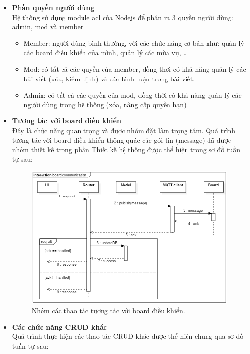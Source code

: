 \documentclass[a4paper,12pt,oneside]{article}
\begin{document}
\begin{itemize}
	\item \textbf{Phần quyền người dùng}\\
	Hệ thống sử dụng module acl của Nodejs để phân ra 3 quyền người dùng: admin, mod và member
	
	\begin{itemize}
		\item Member: người dùng bình thường, với các chức năng cơ bản như: quản lý các board điều khiển của mình, quản lý các mùa vụ, …
		\item Mod: có tất cả các quyền của member, đồng thời có khả năng quản lý các bài viết (xóa, kiểm định) và các bình luận trong bài viết.
		\item Admin: có tất cả các quyền của mod, đồng thời có khả năng quản lý các người dùng trong hệ thống (xóa, nâng cấp quyền hạn).
	\end{itemize}
	
	\item \textbf{Tương tác với board điều khiển}\\
	Đây là chức năng quan trọng và được nhóm đặt làm trọng tâm. Quá trình tương tác với board điều khiển thông quác các gói tin (message) đã được nhóm thiết kế trong phần Thiết kế hệ thống được thể hiện trong sơ đồ tuần tự sau:
	
	\begin{figure}[H]
		\centering
		\includegraphics[scale=.6]{hinh/seq-board-communication.png}
		\caption{Nhóm các thao tác tương tác với board điều khiển.}
	\end{figure}
	
	\item \textbf{Các chức năng CRUD khác}\\
	Quá trình thực hiện các thao tác CRUD khác được thể hiện chung qua sơ đồ tuần tự sau:
	

\end{itemize}
\end{document}
